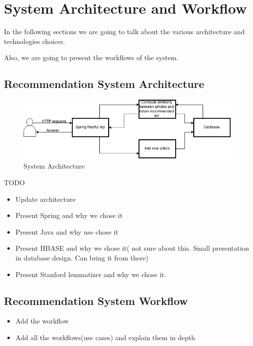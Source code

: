 \chapter{System Architecture and Workflow}
\label{chapter:system-architecture}

In the following sections we are going to talk about the various architecture and technologies choices.

Also, we are going to present the workflows of the system.

\section{Recommendation System Architecture} 
\label{sec:architecture}

\begin{figure}[h]
\caption{System Architecture}
\includegraphics[width=1.0\textwidth]{src/img/architecture.png}
\end{figure}


TODO
\begin{itemize}
	\item Update architecture
	\item Present Spring and why we chose it	
	\item Present Java and why use chose it
	\item Present HBASE and why we chose it( not sure about this. Small presentation in database design. Can bring it from there)
	\item Present Stanford lemmatizer and why we chose it.	
\end{itemize}


\section{Recommendation System Workflow} 
\label{sec:workflow}

\begin{itemize}
	\item Add the workflow
	\item Add all the workflows(use cases) and explain them in depth
\end{itemize}